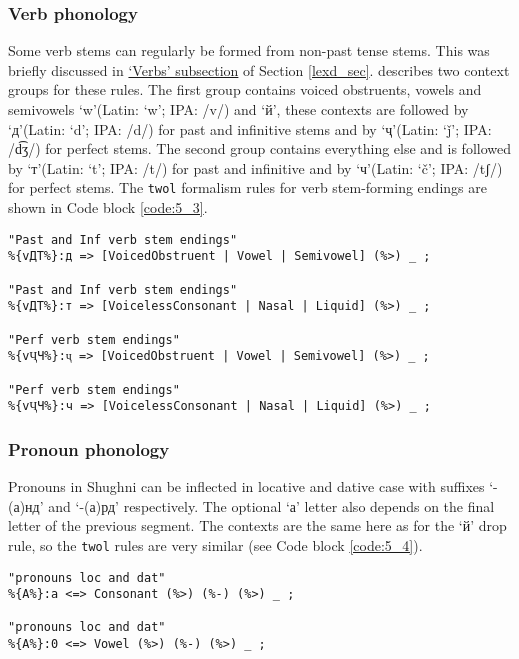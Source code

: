 \subsubsection{Verb phonology}
Some verb stems can regularly be formed from non-past tense stems. This was briefly discussed in \hyperref[lexd_verbs]{`Verbs' subsection} of Section \ref{lexd_sec}. \textcite[256]{parker_shughni_2023} describes two context groups for these rules. The first group contains voiced obstruents, vowels and semivowels `w'(Latin: `w'; IPA: /v/) and `й', these contexts are followed by `д'(Latin: `d'; IPA: /d/) for past and infinitive stems and by `ҷ'(Latin: `ǰ'; IPA: /d͡ʒ/) for perfect stems. The second group contains everything else and is followed by `т'(Latin: `t'; IPA: /t/) for past and infinitive and by `ч'(Latin: `č'; IPA: /tʃ/) for perfect stems. The \texttt{twol} formalism rules for verb stem-forming endings are shown in Code block \ref{code:5_3}. 

\begin{code_frame}[float,floatplacement=!h]
    \begin{footnotesize}\codespacing
    \begin{verbatim}
"Past and Inf verb stem endings"
%{vДТ%}:д => [VoicedObstruent | Vowel | Semivowel] (%>) _ ;

"Past and Inf verb stem endings"
%{vДТ%}:т => [VoicelessConsonant | Nasal | Liquid] (%>) _ ;

"Perf verb stem endings"
%{vҶЧ%}:ҷ => [VoicedObstruent | Vowel | Semivowel] (%>) _ ;

"Perf verb stem endings"
%{vҶЧ%}:ч => [VoicelessConsonant | Nasal | Liquid] (%>) _ ;
    \end{verbatim}
    \end{footnotesize}
    \tcblower
    \label{code:5_3}
\end{code_frame}

\subsubsection{Pronoun phonology}
Pronouns in Shughni can be inflected in locative and dative case with suffixes `-(а)нд' and `-(а)рд' respectively. The optional `а' letter also depends on the final letter of the previous segment. The contexts are the same here as for the `й' drop rule, so the \texttt{twol} rules are very similar (see Code block \ref{code:5_4}).

\begin{code_frame}[float,floatplacement=!h]
    \begin{footnotesize}\codespacing
    \begin{verbatim}
"pronouns loc and dat"
%{А%}:а <=> Consonant (%>) (%-) (%>) _ ;

"pronouns loc and dat"
%{А%}:0 <=> Vowel (%>) (%-) (%>) _ ;
    \end{verbatim}
    \end{footnotesize}
    \tcblower
    \label{code:5_4}
\end{code_frame}

\FloatBarrier
